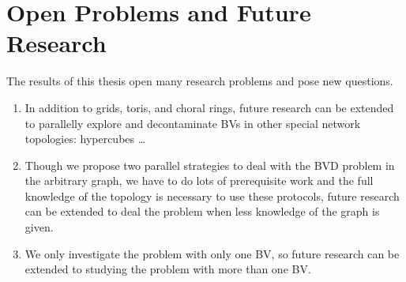\section{Open Problems and Future Research}
The results of this thesis open many research problems and pose new questions.
\begin{enumerate}
\item In addition to grids, toris, and choral rings, future research can be extended to parallelly explore and decontaminate BVs in other special network topologies: hypercubes \ldots
\item Though we propose two parallel strategies to deal with the BVD problem in the arbitrary graph, we have to do lots of prerequisite work and the full knowledge of the topology is necessary to use these protocols, future research can be extended to deal the problem when less knowledge of the graph is given.
\item We only investigate the problem with only one BV, so future research can be extended to studying the problem with more than one BV.
\end{enumerate}


















